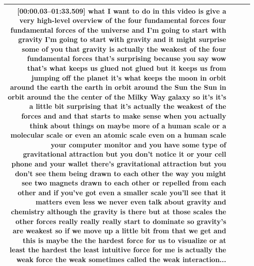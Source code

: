 \documentclass[10pt]{article}
\begin{document}
\begin{tiny}
\begin{longtable}{|r|p{0.375in}|p{1.275in}|p{3.5in}|}
                                                                                                                                                                                                                               \textbf{[00:00.03--01:33.509]} what I want to do in this video is give a very high-level overview of the four fundamental forces four fundamental forces of the universe and I'm going to start with gravity I'm going to start with gravity and it might surprise some of you that gravity is actually the weakest of the four fundamental forces that's surprising because you say wow that's what keeps us glued not glued but it keeps us from jumping off the planet it's what keeps the moon in orbit around the earth the earth in orbit around the Sun the Sun in orbit around the the center of the Milky Way galaxy so it's it's a little bit surprising that it's actually the weakest of the forces and and that starts to make sense when you actually think about things on maybe more of a human scale or a molecular scale or even an atomic scale even on a human scale your computer monitor and you have some type of gravitational attraction but you don't notice it or your cell phone and your wallet there's gravitational attraction but you don't see them being drawn to each other the way you might see two magnets drawn to each other or repelled from each other and if you've got even a smaller scale you'll see that it matters even less we never even talk about gravity and chemistry although the gravity is there but at those scales the other forces really really really start to dominate so gravity's are weakest so if we move up a little bit from that we get and this is maybe the the hardest force for us to visualize or at least the hardest the least intuitive force for me is actually the weak force the weak sometimes called the weak interaction... \\\hline

\end{longtable}
\end{tiny}
\end{document}
